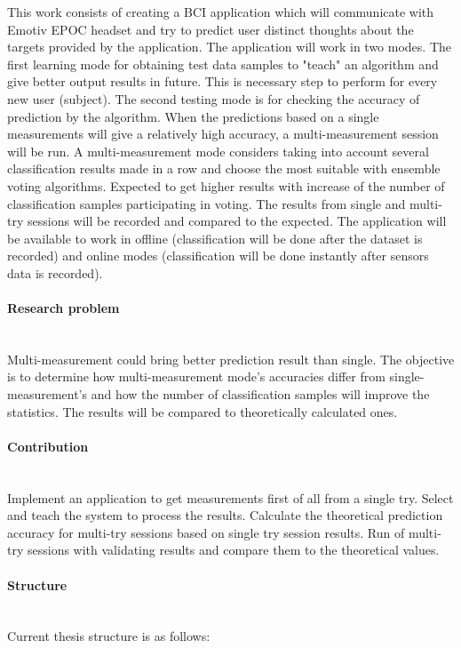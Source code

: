 \documentclass[12pt]{article}
\begin{document}
This work consists of creating a BCI application which will communicate with Emotiv EPOC headset and try to predict user distinct thoughts about the targets provided by the application. The application will work in two modes. The first learning mode for obtaining test data samples to "teach" an algorithm and give better output results in future. This is necessary step to perform for every new user (subject). The second testing mode is for checking the accuracy of prediction by the algorithm. When the predictions based on a single measurements will give a relatively high accuracy, a multi-measurement session will be run. A multi-measurement mode considers taking into account several classification results made in a row and choose the most suitable with ensemble voting algorithms. Expected to get higher results with increase of the number of classification samples participating in voting. The results from single and multi-try sessions will be recorded and compared to the expected. The application will be available to work in offline (classification will be done after the dataset is recorded) and online modes (classification will be done instantly after sensors data is recorded).
\paragraph{Research problem}~\\

Multi-measurement could bring better prediction result than single. The objective is to determine how multi-measurement mode's accuracies differ from single-measurement's and how the number of classification samples will improve the statistics. The results will be compared to theoretically calculated ones.
\paragraph{Contribution}~\\

Implement an application to get measurements first of all from a single try. Select and teach the system to process the results. Calculate the theoretical prediction accuracy for multi-try sessions based on single try session results. Run of multi-try sessions with validating results and compare them to the theoretical values.
\paragraph{Structure}~\\
Current thesis structure is as follows:
\end{document}
